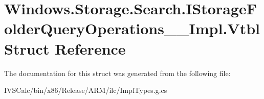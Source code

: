 \hypertarget{struct_windows_1_1_storage_1_1_search_1_1_i_storage_folder_query_operations_____impl_1_1_vtbl}{}\section{Windows.\+Storage.\+Search.\+I\+Storage\+Folder\+Query\+Operations\+\_\+\+\_\+\+Impl.\+Vtbl Struct Reference}
\label{struct_windows_1_1_storage_1_1_search_1_1_i_storage_folder_query_operations_____impl_1_1_vtbl}


The documentation for this struct was generated from the following file\+:\begin{DoxyCompactItemize}
\item 
I\+V\+S\+Calc/bin/x86/\+Release/\+A\+R\+M/ilc/Impl\+Types.\+g.\+cs\end{DoxyCompactItemize}
